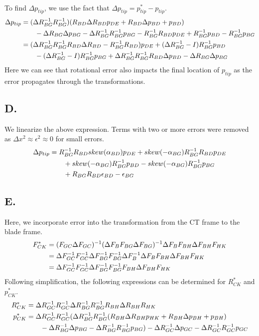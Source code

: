 \documentclass[letterpaper, 11pt]{article}
\begin{document}
\\
To find $\Delta p_{tip}$, we use the fact that $\Delta p_{tip} = p_{tip}^* - p_{tip}$.
\begin{align}
	\Delta p_{tip} &= (\Delta R_{BG}^{-1}R_{BG}^{-1})(R_{BD}\Delta R_{BD}p_{DE} + R_{BD}\Delta p_{BD} + p_{BD}) \notag \\
    & \qquad -\Delta R_{BG}\Delta p_{BG} - \Delta R_{BG}^{-1}R_{BG}^{-1}p_{BG} - R_{BG}^{-1}R_{BD}p_{DE} + R_{BG}^{-1}p_{BD}-R_{BG}^{-1}p_{BG}  \\
    &= (\Delta R_{BG}^{-1}R_{BG}^{-1}R_{BD}\Delta R_{BD} - R_{BG}^{-1}R_{BD})p_{DE} + (\Delta R_{BG}^{-1} - I)R_{BG}^{-1}p_{BD}  \notag \\
    & \qquad - (\Delta R_{BG}^{-1} - I)R_{BG}^{-1}p_{BG} + \Delta R_{BG}^{-1}R_{BG}^{-1}R_{BD}\Delta p_{BD} - \Delta R_{BG}\Delta p_{BG}  
\end{align}
Here we can see that rotational error also impacts the final location of $p_{tip}$ as the error propagates through the transformations.
\subsection*{D.}
We linearize the above expression. Terms with two or more errors were removed as  $\Delta x^2 \approx \epsilon^2 \approx 0$ for small errors.
\begin{align}
\Delta p_{tip} & = R_{BG}^{-1}R_{BD}skew(\alpha_{BD})p_{DE} + skew(-\alpha_{BG})R_{BG}^{-1}R_{BD}p_{DE} \notag \\ 
& \qquad + skew(-\alpha_{BG})R_{BG}^{-1}p_{BD} - skew(-\alpha_{BG})R_{BG}^{-1}p_{BG} \notag \\ 
 & \qquad + R_{BG}R_{BD}\epsilon_{BD} - \epsilon_{BG}
\end{align}
\subsection*{E.}
Here, we incorporate error into the transformation from the CT frame to the blade frame. 
\begin{align}
	F_{CK}^* &= (F_{GC}\Delta F_{GC})^{-1}(\Delta F_BF_{BG}\Delta F_{BG})^{-1}\Delta F_BF_{BH}\Delta F_{BH}F_{HK} \notag \\
    &= \Delta F_{GC}^{-1}F_{GC}^{-1}\Delta F_{BG}^{-1}F_{BG}^{-1}\Delta F_B^{-1}\Delta F_BF_{BH}\Delta F_{BH}F_{HK} \notag \\
    &= \Delta F_{GC}^{-1}F_{GC}^{-1}\Delta F_{BG}^{-1}F_{BG}^{-1}F_{BH}\Delta F_{BH}F_{HK} \notag
\end{align}
Following simplification, the following expressions can be determined for $R_{CK}^*$ and $p_{CK}^*$.
\begin{align}
	R_{CK}^* &= \Delta R_{GC}^{-1}R_{GC}^{-1}\Delta R_{BG}^{-1}R_{BG}^{-1}R_{BH}\Delta R_{BH}R_{HK} \\
    p_{CK}^* &= \Delta R_{GC}^{-1}R_{GC}^{-1}(\Delta R_{BG}^{-1}R_{BG}^{-1}(R_{BH}\Delta R_{BH}p_{HK} + R_{BH}\Delta p_{BH} + p_{BH}) \notag \\ 
    & \qquad - \Delta R_{BG}^{-1}\Delta p_{BG} - \Delta R_{BG}^{-1}R_{BG}^{-1}p_{BG}) - \Delta R_{GC}^{-1}\Delta p_{GC} - \Delta R_{GC}^{-1}R_{GC}^{-1}p_{GC}
\end{align}
\end{document}
